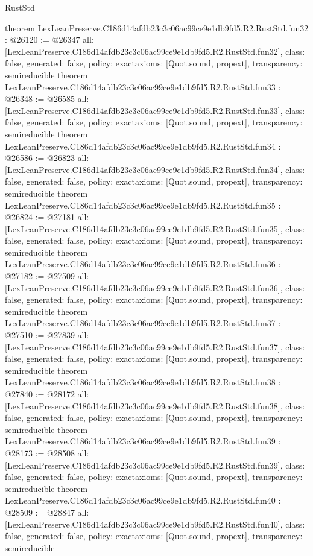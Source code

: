 \begin{lexlean}{RustStd}
\begin{coremodule}
{}
theorem LexLeanPreserve.C186d14afdb23c3c06ac99ce9e1db9fd5.R2.RustStd.fun32 : @26120 := @26347 {
  all: [LexLeanPreserve.C186d14afdb23c3c06ac99ce9e1db9fd5.R2.RustStd.fun32],
  class: false,
  generated: false,
  policy: exact{axioms: [Quot.sound, propext]},
  transparency: semireducible
}
theorem LexLeanPreserve.C186d14afdb23c3c06ac99ce9e1db9fd5.R2.RustStd.fun33 : @26348 := @26585 {
  all: [LexLeanPreserve.C186d14afdb23c3c06ac99ce9e1db9fd5.R2.RustStd.fun33],
  class: false,
  generated: false,
  policy: exact{axioms: [Quot.sound, propext]},
  transparency: semireducible
}
theorem LexLeanPreserve.C186d14afdb23c3c06ac99ce9e1db9fd5.R2.RustStd.fun34 : @26586 := @26823 {
  all: [LexLeanPreserve.C186d14afdb23c3c06ac99ce9e1db9fd5.R2.RustStd.fun34],
  class: false,
  generated: false,
  policy: exact{axioms: [Quot.sound, propext]},
  transparency: semireducible
}
theorem LexLeanPreserve.C186d14afdb23c3c06ac99ce9e1db9fd5.R2.RustStd.fun35 : @26824 := @27181 {
  all: [LexLeanPreserve.C186d14afdb23c3c06ac99ce9e1db9fd5.R2.RustStd.fun35],
  class: false,
  generated: false,
  policy: exact{axioms: [Quot.sound, propext]},
  transparency: semireducible
}
theorem LexLeanPreserve.C186d14afdb23c3c06ac99ce9e1db9fd5.R2.RustStd.fun36 : @27182 := @27509 {
  all: [LexLeanPreserve.C186d14afdb23c3c06ac99ce9e1db9fd5.R2.RustStd.fun36],
  class: false,
  generated: false,
  policy: exact{axioms: [Quot.sound, propext]},
  transparency: semireducible
}
theorem LexLeanPreserve.C186d14afdb23c3c06ac99ce9e1db9fd5.R2.RustStd.fun37 : @27510 := @27839 {
  all: [LexLeanPreserve.C186d14afdb23c3c06ac99ce9e1db9fd5.R2.RustStd.fun37],
  class: false,
  generated: false,
  policy: exact{axioms: [Quot.sound, propext]},
  transparency: semireducible
}
theorem LexLeanPreserve.C186d14afdb23c3c06ac99ce9e1db9fd5.R2.RustStd.fun38 : @27840 := @28172 {
  all: [LexLeanPreserve.C186d14afdb23c3c06ac99ce9e1db9fd5.R2.RustStd.fun38],
  class: false,
  generated: false,
  policy: exact{axioms: [Quot.sound, propext]},
  transparency: semireducible
}
theorem LexLeanPreserve.C186d14afdb23c3c06ac99ce9e1db9fd5.R2.RustStd.fun39 : @28173 := @28508 {
  all: [LexLeanPreserve.C186d14afdb23c3c06ac99ce9e1db9fd5.R2.RustStd.fun39],
  class: false,
  generated: false,
  policy: exact{axioms: [Quot.sound, propext]},
  transparency: semireducible
}
theorem LexLeanPreserve.C186d14afdb23c3c06ac99ce9e1db9fd5.R2.RustStd.fun40 : @28509 := @28847 {
  all: [LexLeanPreserve.C186d14afdb23c3c06ac99ce9e1db9fd5.R2.RustStd.fun40],
  class: false,
  generated: false,
  policy: exact{axioms: [Quot.sound, propext]},
  transparency: semireducible
}
\end{coremodule}
\end{lexlean}

